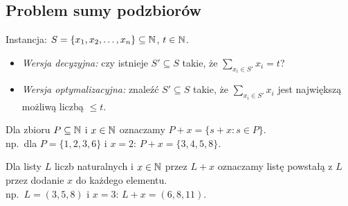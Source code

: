 \subsection{Problem sumy podzbiorów}

\begin{problem} \label{problem:subsetsum}
Instancja: $S = \{x_1, x_2, \ldots, x_n\} \subseteq \mathbb{N}$, $t \in \mathbb{N}$.
\begin{itemize}[nosep]
	\item \emph{Wersja decyzyjna:} czy istnieje $S' \subseteq S$ takie, że $\sum_{x_i \in S'} x_i = t$?
	\item \emph{Wersja optymalizacyjna:} znaleźć $S' \subseteq S$ takie, że $\sum_{x_i \in S'} x_i$ jest największą możliwą liczbą $\leq t$.
\end{itemize}
\end{problem}

Dla zbioru $P \subseteq \mathbb{N}$ i $x \in \mathbb{N}$ oznaczamy $P + x = \{s + x : s \in P\}$.\\
np.\ dla $P = \{1, 2, 3, 6\}$ i $x = 2$: \quad $P + x = \{3, 4, 5, 8\}$.

Dla listy $L$ liczb naturalnych i $x \in \mathbb{N}$ przez $L + x$ oznaczamy listę powstałą z $L$ przez dodanie $x$ do każdego elementu.\\
np.\ $L = (3, 5, 8)$ i $x = 3$: \quad $L + x = (6, 8, 11)$.

